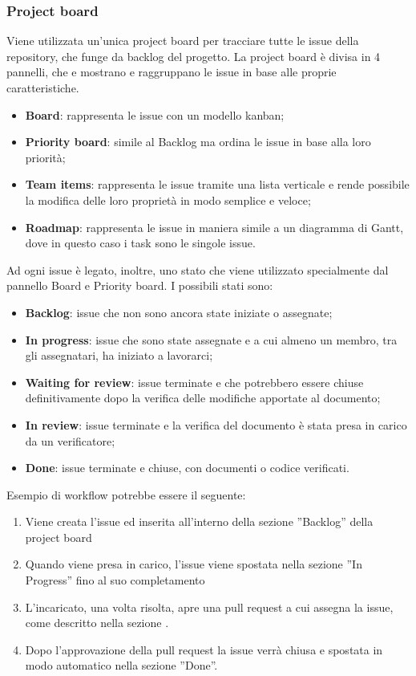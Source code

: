         \subsubsection{Project board}\label{inf:pb}
        Viene utilizzata un'unica project board per tracciare tutte le issue della repository, che funge da backlog del progetto.
        La project board è divisa in 4 pannelli, che e mostrano e raggruppano le issue in base alle proprie caratteristiche.
        \begin{itemize}
            \item \textbf{Board}: rappresenta le issue con un modello kanban;
            \item \textbf{Priority board}: simile al Backlog ma ordina le issue in base alla loro priorità;
            \item \textbf{Team items}: rappresenta le issue tramite una lista verticale e rende possibile 
            la modifica delle loro proprietà in modo semplice e veloce;
            \item \textbf{Roadmap}: rappresenta le issue in maniera simile a un diagramma di Gantt, 
            dove in questo caso i task sono le singole issue.
        \end{itemize}
        Ad ogni issue è legato, inoltre, uno stato che viene utilizzato specialmente dal pannello Board e Priority board. 
        I possibili stati sono:
        \begin{itemize}
            \item \textbf{Backlog}: issue che non sono ancora state iniziate o assegnate;
            \item \textbf{In progress}: issue che sono state assegnate e a cui almeno un membro, tra gli assegnatari, ha iniziato a lavorarci;
            \item \textbf{Waiting for review}: issue terminate e che potrebbero essere chiuse definitivamente dopo la verifica delle modifiche apportate al documento;
            \item \textbf{In review}: issue terminate e la verifica del documento è stata presa in carico da un verificatore;
            \item \textbf{Done}: issue terminate e chiuse, con documenti o codice verificati.
        \end{itemize}
        Esempio di workflow potrebbe essere il seguente:
        \begin{enumerate}
            \item Viene creata l'issue ed inserita all'interno della sezione ”Backlog” della project board
            \item Quando viene presa in carico, l'issue viene spostata nella sezione ”In Progress” fino al suo completamento
            \item L'incaricato, una volta risolta, apre una pull request a cui assegna la issue, come descritto nella sezione .
            \item Dopo l'approvazione della pull request la issue verrà chiusa e spostata in modo automatico nella sezione ”Done”.
        \end{enumerate}


